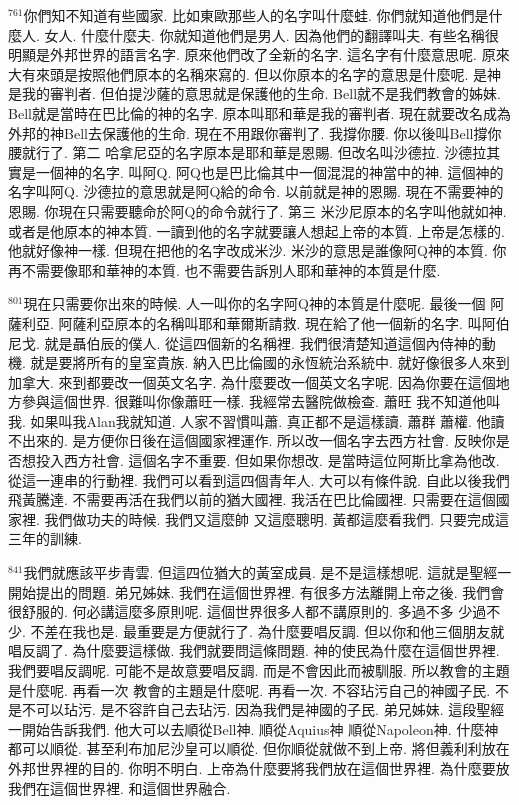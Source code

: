 \documentclass{book}
\begin{document}
$^{761}$你們知不知道有些國家.
比如東歐那些人的名字叫什麼蛙.
你們就知道他們是什麼人.
女人.
什麼什麼夫.
你就知道他們是男人.
因為他們的翻譯叫夫.
有些名稱很明顯是外邦世界的語言名字.
原來他們改了全新的名字.
這名字有什麼意思呢.
原來大有來頭是按照他們原本的名稱來寫的.
但以你原本的名字的意思是什麼呢.
是神是我的審判者.
但伯提沙薩的意思就是保護他的生命.
Bell就不是我們教會的姊妹.
Bell就是當時在巴比倫的神的名字.
原本叫耶和華是我的審判者.
現在就要改名成為外邦的神Bell去保護他的生命.
現在不用跟你審判了.
我撐你腰.
你以後叫Bell撐你腰就行了.
第二 哈拿尼亞的名字原本是耶和華是恩賜.
但改名叫沙德拉.
沙德拉其實是一個神的名字.
叫阿Q.
阿Q也是巴比倫其中一個混混的神當中的神.
這個神的名字叫阿Q.
沙德拉的意思就是阿Q給的命令.
以前就是神的恩賜.
現在不需要神的恩賜.
你現在只需要聽命於阿Q的命令就行了.
第三 米沙尼原本的名字叫他就如神.
或者是他原本的神本質.
一讀到他的名字就要讓人想起上帝的本質.
上帝是怎樣的.
他就好像神一樣.
但現在把他的名字改成米沙.
米沙的意思是誰像阿Q神的本質.
你再不需要像耶和華神的本質.
也不需要告訴別人耶和華神的本質是什麼.

$^{801}$現在只需要你出來的時候.
人一叫你的名字阿Q神的本質是什麼呢.
最後一個 阿薩利亞.
阿薩利亞原本的名稱叫耶和華爾斯請救.
現在給了他一個新的名字.
叫阿伯尼戈.
就是聶伯辰的僕人.
從這四個新的名稱裡.
我們很清楚知道這個內侍神的動機.
就是要將所有的皇室貴族.
納入巴比倫國的永恆統治系統中.
就好像很多人來到加拿大.
來到都要改一個英文名字.
為什麼要改一個英文名字呢.
因為你要在這個地方參與這個世界.
很難叫你像蕭旺一樣.
我經常去醫院做檢查.
蕭旺 我不知道他叫我.
如果叫我Alan我就知道.
人家不習慣叫蕭.
真正都不是這樣讀.
蕭群 蕭權.
他讀不出來的.
是方便你日後在這個國家裡運作.
所以改一個名字去西方社會.
反映你是否想投入西方社會.
這個名字不重要.
但如果你想改.
是當時這位阿斯比拿為他改.
從這一連串的行動裡.
我們可以看到這四個青年人.
大可以有條件說.
自此以後我們飛黃騰達.
不需要再活在我們以前的猶大國裡.
我活在巴比倫國裡.
只需要在這個國家裡.
我們做功夫的時候.
我們又這麼帥 又這麼聰明.
黃都這麼看我們.
只要完成這三年的訓練.

$^{841}$我們就應該平步青雲.
但這四位猶大的黃室成員.
是不是這樣想呢.
這就是聖經一開始提出的問題.
弟兄姊妹.
我們在這個世界裡.
有很多方法離開上帝之後.
我們會很舒服的.
何必講這麼多原則呢.
這個世界很多人都不講原則的.
多過不多 少過不少.
不差在我也是.
最重要是方便就行了.
為什麼要唱反調.
但以你和他三個朋友就唱反調了.
為什麼要這樣做.
我們就要問這條問題.
神的使民為什麼在這個世界裡.
我們要唱反調呢.
可能不是故意要唱反調.
而是不會因此而被馴服.
所以教會的主題是什麼呢.
再看一次 教會的主題是什麼呢.
再看一次.
不容玷污自己的神國子民.
不是不可以玷污.
是不容許自己去玷污.
因為我們是神國的子民.
弟兄姊妹.
這段聖經一開始告訴我們.
他大可以去順從Bell神.
順從Aquius神 順從Napoleon神.
什麼神都可以順從.
甚至利布加尼沙皇可以順從.
但你順從就做不到上帝.
將但義利利放在外邦世界裡的目的.
你明不明白.
上帝為什麼要將我們放在這個世界裡.
為什麼要放我們在這個世界裡.
和這個世界融合.
\end{document}

